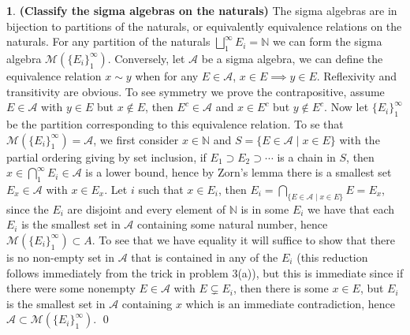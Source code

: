 \documentclass[10.5pt]{article}
\theoremstyle{definition}
\newtheorem{pb}{}
\newcommand{\set}[1]{\{#1\}}
\begin{document}
    \begin{pb}\textbf{(Classify the sigma algebras on the naturals)} The sigma algebras are in bijection to partitions of the naturals, or equivalently equivalence relations on the naturals. For any partition of the naturals \(\bigsqcup_1^\infty E_i = \mathbb{N}\) we can form the sigma algebra \(\mathcal{M}(\set{E_i}_1^\infty)\). Conversely, let \(\mathcal{A}\) be a sigma algebra, we can define the equivalence relation \(x \sim y\) when for any \(E \in \mathcal{A}\), \(x \in E \implies y \in E\). Reflexivity and transitivity are obvious. To see symmetry we prove the contrapositive, assume \(E \in \mathcal{A}\) with \(y \in E\) but \(x \not \in E\), then \(E^c \in \mathcal{A}\) and \(x \in E^c\) but \(y \not \in E^c\). Now let \(\set{E_i}_1^\infty\) be the partition corresponding to this equivalence relation. To se that \(\mathcal{M}(\set{E_i}_1^\infty) = \mathcal{A}\), we first consider \(x \in \mathbb{N}\) and \(S = \set{E \in \mathcal{A} \mid x \in E}\) with the partial ordering giving by set inclusion, if \(E_1 \supset E_2 \supset \cdots\) is a chain in \(S\), then \(x \in \bigcap_1^\infty E_i \in \mathcal{A}\) is a lower bound, hence by Zorn's lemma there is a smallest set \(E_x \in \mathcal{A}\) with \(x \in E_x\). Let \(i\) such that \(x \in E_i\), then \(E_i = \bigcap_{\set{E \in \mathcal{A}\mid x \in E}}E = E_x\), since the \(E_i\) are disjoint and every element of \(\mathbb{N}\) is in some \(E_i\) we have that each \(E_i\) is the smallest set in \(\mathcal{A}\) containing some natural number, hence \(\mathcal{M}(\set{E_i}_1^\infty) \subset A\). To see that we have equality it will suffice to show that there is no non-empty set in \(\mathcal{A}\) that is contained in any of the \(E_i\) (this reduction follows immediately from the trick in problem 3(a)), but this is immediate since if there were some nonempty \(E \in \mathcal{A}\) with \(E \subsetneq E_i\), then there is some \(x \in E\), but \(E_i\) is the smallest set in \(\mathcal{A}\) containing \(x\) which is an immediate contradiction, hence \(\mathcal{A} \subset \mathcal{M}(\set{E_i}_1^\infty)\). \qed
        
    \end{pb}
\end{document}
